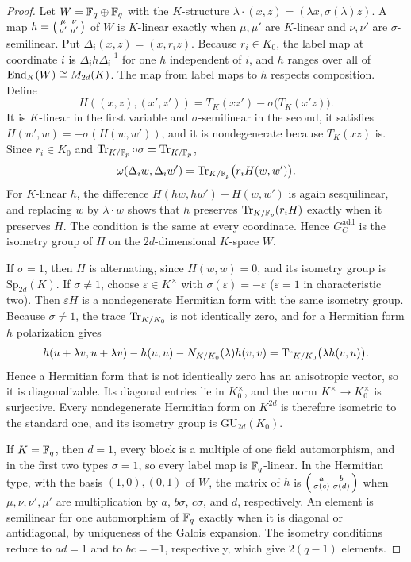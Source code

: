 \begin{proof}
Let \(W=\mathbb F_q\oplus\mathbb F_q\) with the \(K\)-structure
\(\lambda\cdot(x,z)=(\lambda x,\sigma(\lambda)z)\).  A map
\(h=\begin{psmallmatrix}\mu&\nu\\\nu'&\mu'\end{psmallmatrix}\) of \(W\) is
\(K\)-linear exactly when \(\mu,\mu'\) are \(K\)-linear and \(\nu,\nu'\) are
\(\sigma\)-semilinear.  Put \(\Delta_i(x,z)=(x,r_iz)\).  Because
\(r_i\in K_0\), the label map at coordinate \(i\) is
\(\Delta_ih\Delta_i^{-1}\) for one \(h\) independent of \(i\), and
\(h\) ranges over all of \(\operatorname{End}_K(W)\cong M_{2d}(K)\).  The map from label
maps to \(h\) respects composition.  Define
\[
 H((x,z),(x',z'))=T_K(xz')-\sigma\bigl(T_K(x'z)\bigr).
\]
It is \(K\)-linear in the first variable and \(\sigma\)-semilinear in the
second, it satisfies \(H(w',w)=-\sigma(H(w,w'))\), and it is
nondegenerate because \(T_K(xz)\) is.  Since
\(r_i\in K_0\) and \(\operatorname{Tr}_{K/\mathbb F_p}\circ\sigma=\operatorname{Tr}_{K/\mathbb F_p}\),
\[
 \omega(\Delta_iw,\Delta_iw')=\operatorname{Tr}_{K/\mathbb F_p}\bigl(r_iH(w,w')\bigr).
\]
For \(K\)-linear \(h\), the difference \(H(hw,hw')-H(w,w')\) is again
sesquilinear, and replacing \(w\) by \(\lambda\cdot w\) shows that
\(h\) preserves \(\operatorname{Tr}_{K/\mathbb F_p}(r_iH)\) exactly when it preserves \(H\).  The
condition is the same at every coordinate.  Hence \(G^{\mathrm{add}}_C\) is
the isometry group of \(H\) on the \(2d\)-dimensional \(K\)-space \(W\).

If \(\sigma=1\), then \(H\) is alternating, since \(H(w,w)=0\), and its
isometry group is \(\mathrm{Sp}_{2d}(K)\).  If \(\sigma\ne1\), choose
\(\varepsilon\in K^\times\) with \(\sigma(\varepsilon)=-\varepsilon\)
(\(\varepsilon=1\) in characteristic two).  Then \(\varepsilon H\) is a
nondegenerate Hermitian form with the same isometry group.  Because
\(\sigma\ne1\), the trace \(\operatorname{Tr}_{K/K_0}\) is not identically zero, and for a
Hermitian form \(h\) polarization gives
\[
 h(u+\lambda v,u+\lambda v)-h(u,u)-N_{K/K_0}(\lambda)h(v,v)
 =\operatorname{Tr}_{K/K_0}\bigl(\lambda h(v,u)\bigr).
\]
Hence a Hermitian
form that is not identically zero has an anisotropic vector, so it is
diagonalizable.  Its diagonal entries lie in \(K_0^\times\), and the
norm \(K^\times\to K_0^\times\) is surjective.  Every nondegenerate
Hermitian form on \(K^{2d}\) is therefore isometric to the standard one, and
its isometry group is \(\mathrm{GU}_{2d}(K_0)\).

If \(K=\mathbb F_q\), then \(d=1\), every block is a multiple of one field
automorphism, and in the first two types \(\sigma=1\), so every label map is
\(\mathbb F_q\)-linear.  In the Hermitian type, with the basis
\((1,0),(0,1)\) of \(W\), the matrix of \(h\) is
\(\begin{psmallmatrix}a&b\\\sigma(c)&\sigma(d)\end{psmallmatrix}\) when
\(\mu,\nu,\nu',\mu'\) are multiplication by \(a\), \(b\sigma\), \(c\sigma\),
and \(d\), respectively.  An element is semilinear for one automorphism of
\(\mathbb F_q\) exactly when it is diagonal or antidiagonal, by uniqueness of the
Galois expansion.  The isometry conditions reduce to \(ad=1\) and to
\(bc=-1\), respectively, which give \(2(q-1)\) elements.
\end{proof}

